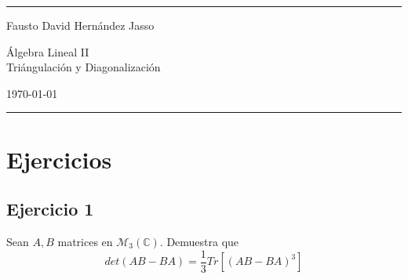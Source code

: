 \documentclass[a4paper]{article}
\begin{document}

\fancyhead[C]{}
\hrule \medskip %
\begin{minipage}{0.35\textwidth} 
\raggedright
\footnotesize
Fausto David Hernández Jasso \hfill\\   
\end{minipage}
\begin{minipage}{0.4\textwidth} 
\centering 
\large 
Álgebra Lineal II\\ 
\normalsize 
Triángulación y Diagonalización\\ 
\end{minipage}
\begin{minipage}{0.24\textwidth} 
\raggedleft
\today\hfill\\
\end{minipage}
\medskip\hrule 
\bigskip
\section{Ejercicios}
\subsection{Ejercicio 1}
Sean \(A, B\) matrices en \(\mathcal{M}_{3}\left(\mathbb{C}\right)\). Demuestra que
\[
    det\left(AB - BA\right) = \frac{1}{3}Tr\left[\left(AB - BA\right)^3\right]
\]
\noindent
\end{document}
